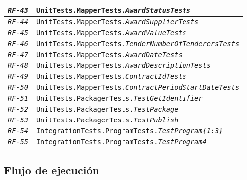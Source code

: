 \begin{longtable}{|| M{3cm} | M{12cm} ||}
                \hline
                    \texttt{\textit{RF-43}} & \texttt{UnitTests.MapperTests.\textit{AwardStatusTests}} \\
                \hline
                    \texttt{\textit{RF-44}} & \texttt{UnitTests.MapperTests.\textit{AwardSupplierTests}} \\
                \hline
                    \texttt{\textit{RF-45}} & \texttt{UnitTests.MapperTests.\textit{AwardValueTests}} \\
                \hline
                    \texttt{\textit{RF-46}} & \texttt{UnitTests.MapperTests.\textit{TenderNumberOfTenderersTests}} \\
                \hline
                    \texttt{\textit{RF-47}} & \texttt{UnitTests.MapperTests.\textit{AwardDateTests}} \\
                \hline
                    \texttt{\textit{RF-48}} & \texttt{UnitTests.MapperTests.\textit{AwardDescriptionTests}} \\
                \hline
                    \texttt{\textit{RF-49}} & \texttt{UnitTests.MapperTests.\textit{ContractIdTests}} \\
                \hline
                    \texttt{\textit{RF-50}} & \texttt{UnitTests.MapperTests.\textit{ContractPeriodStartDateTests}} \\
                \hline
                    \texttt{\textit{RF-51}} & \texttt{UnitTests.PackagerTests.\textit{TestGetIdentifier}} \\
                \hline
                    \texttt{\textit{RF-52}} & \texttt{UnitTests.PackagerTests.\textit{TestPackage}} \\
                \hline
                    \texttt{\textit{RF-53}} & \texttt{UnitTests.PackagerTests.\textit{TestPublish}} \\
                \hline
                    \texttt{\textit{RF-54}} & \texttt{IntegrationTests.ProgramTests.\textit{TestProgram\{1:3\}}} \\
                \hline
                    \texttt{\textit{RF-55}} & \texttt{IntegrationTests.ProgramTests.\textit{TestProgram4}} \\
                \hline
        \end{longtable}
        \addtocounter{table}{-1}
        
    \vspace{1cm}
    
    \subsection{Flujo de ejecución} \label{subsec:flujo}
        
